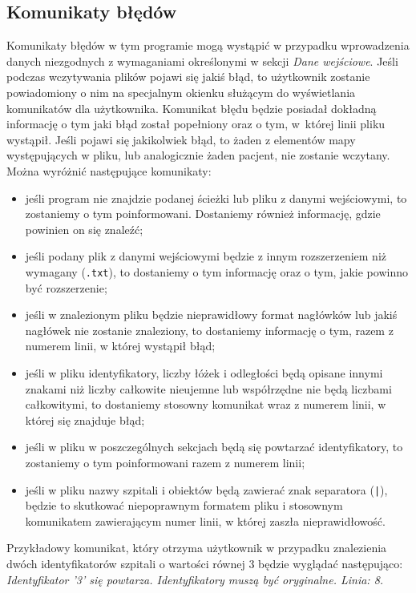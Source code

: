\documentclass[12pt,a4paper]{article}
\begin{document}
\subsection{Komunikaty błędów}
Komunikaty błędów w tym programie mogą wystąpić w przypadku wprowadzenia danych niezgodnych z wymaganiami określonymi w sekcji \textit{Dane wejściowe}. Jeśli podczas wczytywania plików pojawi się jakiś błąd, to użytkownik zostanie powiadomiony o nim na specjalnym okienku służącym do wyświetlania komunikatów dla użytkownika. Komunikat błędu będzie posiadał dokładną informację o tym jaki błąd został popełniony oraz o tym, w~której linii pliku wystąpił. Jeśli pojawi się jakikolwiek błąd, to żaden z elementów mapy występujących w pliku, lub analogicznie żaden pacjent, nie zostanie wczytany.
Można wyróżnić następujące komunikaty:
\begin{itemize}
\item jeśli program nie znajdzie podanej ścieżki lub pliku z danymi wejściowymi, to zostaniemy o tym poinformowani. Dostaniemy również informację, gdzie powinien on się znaleźć; 
\item jeśli podany plik z danymi wejściowymi będzie z innym rozszerzeniem niż wymagany (\texttt{.txt}), to dostaniemy o tym informację oraz o tym, jakie powinno być rozszerzenie;
\item jeśli w znalezionym pliku będzie nieprawidłowy format nagłówków lub jakiś nagłówek nie zostanie znaleziony, to dostaniemy informację o tym, razem z numerem linii, w której wystąpił błąd;
\item jeśli w pliku identyfikatory, liczby łóżek i odległości będą opisane innymi znakami niż liczby całkowite nieujemne lub współrzędne nie będą liczbami całkowitymi, to dostaniemy stosowny komunikat wraz z numerem linii, w której się znajduje błąd;
\item jeśli w pliku w poszczególnych sekcjach będą się powtarzać identyfikatory, to zostaniemy o tym poinformowani razem z numerem linii;
\item jeśli w pliku nazwy szpitali i obiektów będą zawierać znak separatora (\texttt{|}), będzie to skutkować niepoprawnym formatem pliku i stosownym komunikatem zawierającym numer linii, w której zaszła nieprawidłowość.
\end{itemize}

Przykładowy komunikat, który otrzyma użytkownik w przypadku znalezienia dwóch identyfikatorów szpitali o wartości równej 3 będzie wyglądać następująco:\\
\textit{Identyfikator '3' się powtarza. Identyfikatory muszą być oryginalne. Linia: 8.}
\end{document}

